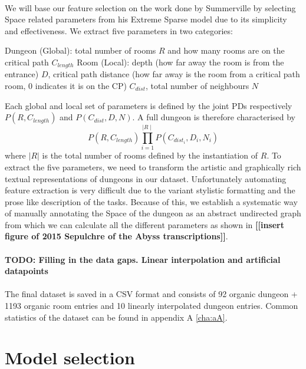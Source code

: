 \documentclass{UoYCSproject}
\begin{document}
\paragraph{}
We will base our feature selection on the work done by Summerville \parencite{SummervilleSamplingHyrule} by selecting Space related parameters from his Extreme Sparse model due to its simplicity and effectiveness. We extract five parameters in two categories: 
\begin{outline}[enumerate]
  \1 Dungeon (Global): total number of rooms \(R\) and how many rooms are on the critical path \(C_{length}\)
  \1 Room (Local): depth (how far away the room is from the entrance) \(D\), critical path distance (how far away is the room from a critical path room, 0 indicates it is on the CP) \(C_{dist}\), total number of neighbours \(N\)
\end{outline}
Each global and local set of parameters is defined by the joint PDs respectively \(P(R, C_{length})\) and \(P(C_{dist}, D, N)\). A full dungeon is therefore characterised by \[P(R, C_{length}) \prod_{i=1}^{\mid R \mid} P(C_{dist_i}, D_i, N_i)\] where \(|R|\) is the total number of rooms defined by the instantiation of \(R\). To extract the five parameters, we need to transform the artistic and graphically rich textual representations of dungeons in our dataset. Unfortunately automating feature extraction is very difficult due to the variant stylistic formatting and the prose like description of the tasks. Because of this, we establish a systematic way of manually annotating the Space of the dungeon as an abstract undirected graph from which we can calculate all the different parameters as shown in \textbf{[[insert figure of 2015 Sepulchre of the Abyss transcriptions]]}.

\paragraph{}
\textbf{TODO: Filling in the data gaps. Linear interpolation and artificial datapoints}

\paragraph{}
The final dataset is saved in a CSV format and consists of 92 organic dungeon + 1193 organic room entries and 10 linearly interpolated dungeon entries. Common statistics of the dataset can be found in appendix A \ref{cha:aA}.

\section{Model selection} %
\label{sec:model_selection}
\end{document}
